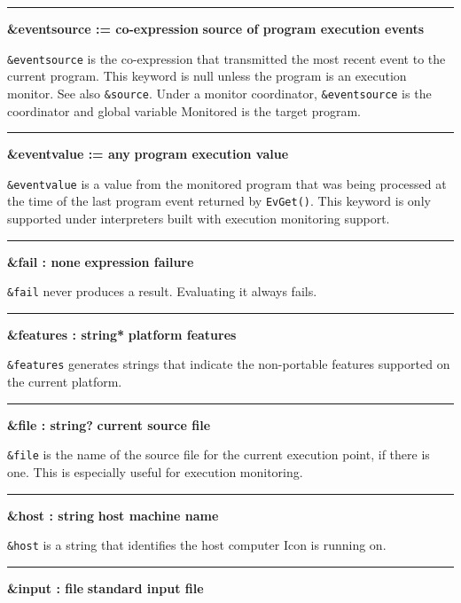 \bigskip\hrule\vspace{0.1cm}
\noindent
{\bf \&eventsource := co{}-expression } \hfill {\bf source of program execution events}

\noindent
\texttt{\&eventsource} is the co-expression that transmitted the most
recent event to the current program. This keyword is null unless the
program is an execution monitor. See also \texttt{\&source}. Under a
monitor coordinator, \texttt{\&eventsource} is the coordinator and
global variable Monitored is the target program.

\bigskip\hrule\vspace{0.1cm}
\noindent
{\bf \&eventvalue := any } \hfill {\bf program execution value}

\noindent
{}\texttt{\&eventvalue} is a value
from the monitored program that was being processed at the time of the
last program event returned by \texttt{EvGet()}. This keyword is only
supported under interpreters built with execution monitoring support.

\bigskip\hrule\vspace{0.1cm}
\noindent
{\bf \&fail : none } \hfill {\bf expression failure}

\noindent
{}\texttt{\&fail} never produces a
result. Evaluating it always fails.

\bigskip\hrule\vspace{0.1cm}
\noindent
{\bf \&features : string* } \hfill {\bf platform features}

\noindent
{}\texttt{\&features} generates strings that indicate the
non-portable features supported on the current platform.

\bigskip\hrule\vspace{0.1cm}
\noindent
{\bf \&file : string? } \hfill {\bf current source file}

\noindent
\texttt{\&file} is the name of the source file for
the current execution point, if there is one. This is especially useful
for execution monitoring.

\bigskip\hrule\vspace{0.1cm}
\noindent
{\bf \&host : string } \hfill {\bf host machine name}

\noindent
{}\texttt{\&host} is a string that
identifies the host computer Icon is running on.

\bigskip\hrule\vspace{0.1cm}
\noindent
{\bf \&input : file } \hfill {\bf standard input file}

